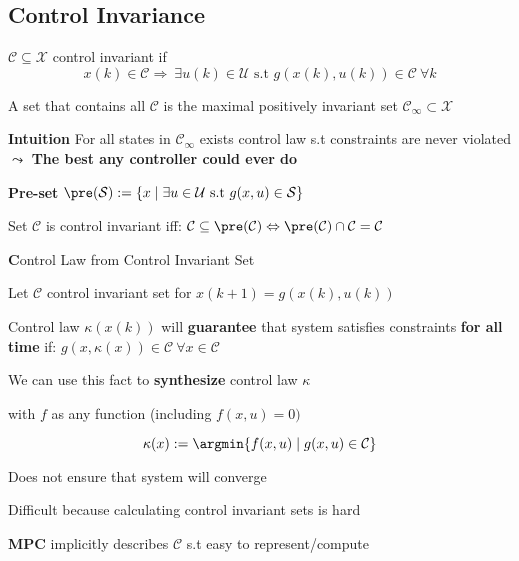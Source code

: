 \subsection{Control Invariance}


\begin{definition}
	$\mathcal{C} \subseteq \mathcal{X}$ control invariant if
	$$x(k) \in \mathcal{C} \Rightarrow
		\ \exists u(k) \in \mathcal{U} \text{ s.t }
		g(x(k),u(k))\in\mathcal{C} \ \forall k$$
\end{definition}

\begin{definition}
	A set that contains all $\mathcal{C}$
	is the maximal positively invariant set
	$\mathcal{C}_\infty \subset \mathcal{X}$

	\textbf{Intuition} For all states in $\mathcal{C}_\infty$
	exists control law s.t constraints are never violated
	$\leadsto$ \textbf{The best any controller could ever do}
\end{definition}

\textbf{Pre-set}
$\pre(\mathcal{S}):=\{x \mid \exists u\in\mathcal{U}
	\text{ s.t } g(x,u) \in \mathcal{S}\}$

Set $\mathcal{C}$ is control invariant iff:
$\mathcal{C}\subseteq\pre(\mathcal{C})
	\Leftrightarrow
	\pre(\mathcal{C})\cap\mathcal{C} = \mathcal{C}$

\begin{sstTitleBox}[BrickRed]{\center\textbf%
		Control Law from Control Invariant Set
	}%

	\begin{sstOnlyFrame}[BrickRed]

		\begin{centering}
			Let	$\mathcal{C}$ control invariant set
			for $x(k+1)=g(x(k),u(k))$

			Control law $\kappa(x(k))$ will \textbf{guarantee}
			that system satisfies constraints \textbf{for all time} if:
			$g(x,\kappa(x)) \in \mathcal{C} \ \forall x \in \mathcal{C}$

			We can use this fact to \textbf{synthesize}
			control law $\kappa$

			with $f$ as any function (including $f(x,u)=0)$

		\end{centering}
		\[
			\kappa(x):=\argmin\{f(x,u) \mid g(x,u)\in\mathcal{C}\}
		\]

		Does not ensure that system will converge

		Difficult because calculating control invariant sets is hard

		\textbf{MPC} implicitly describes $\mathcal{C}$
		s.t easy to represent/compute
	\end{sstOnlyFrame}
\end{sstTitleBox}

